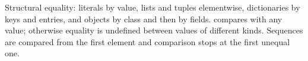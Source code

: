 Structural equality: literals by value, lists and tuples elementwise, dictionaries by keys and
entries, and objects by class and then by fields.  compares with any value;
otherwise equality is undefined between values of different kinds. Sequences are compared from the
first element and comparison stops at the first unequal one.
